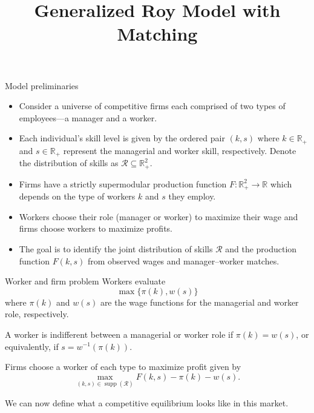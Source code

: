 \documentclass{beamer}
\title[Generalized Roy Model with Matching]{Generalized Roy Model with Matching}
\date{}
\DeclareMathOperator\supp{supp}
\begin{document}
	
	
	
	\begin{frame}
		\titlepage %
	\end{frame}
	

	\begin{frame}{Model preliminaries}
		
		\begin{itemize}
			\item Consider a universe of competitive firms each comprised of two types of employees---a manager and a worker.
			\bigskip
			\item Each individual's skill level is given by the ordered pair $(k,s)$ where $k\in\mathbb{R}_+$ and $s\in\mathbb{R}_+$ represent the managerial and worker skill, respectively. Denote the distribution of skills as $\mathcal{R}\subseteq \mathbb{R}^2_+$.
			
			\bigskip
			
			\item Firms have a strictly supermodular production function $F:\mathbb{R}^2_+ \to \mathbb{R}$ which depends on the type of workers $k$ and $s$ they employ.
			
			\bigskip
			
			\item Workers choose their role (manager or worker) to maximize their wage and firms choose workers to maximize profits.
			
			\bigskip
			
			\item The goal is to identify the joint distribution of skills $\mathcal{R}$ and the production function $F(k,s)$ from observed wages and manager--worker matches.

		\end{itemize}
		

	\end{frame}

	\begin{frame}{Worker and firm problem}
		Workers evaluate 
		\begin{equation*}
			\max\{\pi(k),w(s)\}
		\end{equation*}
		where $\pi(k)$ and $w(s)$ are the wage functions for the managerial and worker role, respectively.

	\bigskip
	
	A worker is indifferent between a managerial or worker role if $\pi(k) = w(s)$, or equivalently, if $s=w^{-1}(\pi(k))$.
	
	\bigskip
	
	Firms choose a worker of each type to maximize profit given by
	\begin{equation*}
		\max_{(k,s)\in\supp(\mathcal{R})} F(k,s) - \pi(k) - w(s).
	\end{equation*}
	
	\bigskip
	
	We can now define what a competitive equilibrium looks like in this market.
	
		\end{frame}
		
\end{document}
